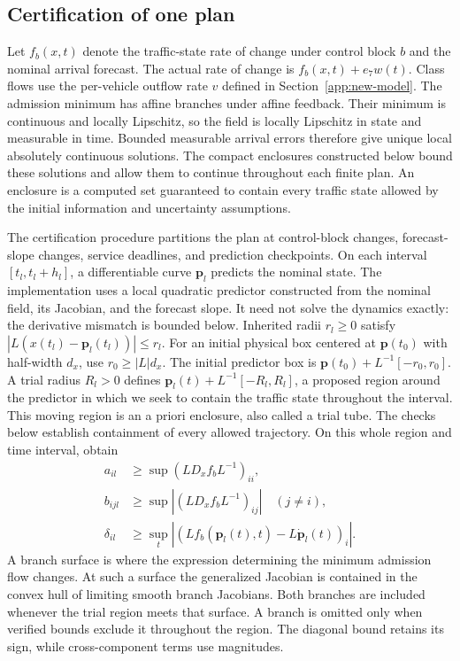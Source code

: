 \documentclass[preprint,12pt]{elsarticle}
\theoremstyle{definition}
\theoremstyle{plain}
\theoremstyle{definition}
\theoremstyle{plain}
\begin{document}
\subsection{Certification of one plan}
\label{app:new-enclosure-proof}

Let $f_b(x,t)$ denote the traffic-state rate of change under control
block $b$ and the nominal arrival forecast. The actual rate of change is
$f_b(x,t)+e_7w(t)$. Class flows use the per-vehicle outflow rate $v$ defined in
Section~\ref{app:new-model}.
The admission minimum has affine branches under affine feedback. Their
minimum is continuous and locally Lipschitz, so the field is locally
Lipschitz in state and measurable in time. Bounded measurable arrival errors
therefore give unique local absolutely continuous solutions. The compact enclosures constructed below bound these solutions and allow
them to continue throughout each finite plan. An enclosure is a computed
set guaranteed to contain every traffic state allowed by the initial
information and uncertainty assumptions.

The certification procedure partitions the plan at control-block changes, forecast-slope
changes, service deadlines, and prediction checkpoints. On each interval
$[t_l,t_l+h_l]$, a differentiable curve $\mathbf p_l$ predicts the nominal
state. The implementation uses a local quadratic predictor constructed
from the nominal field, its Jacobian, and the forecast slope. It need not
solve the dynamics exactly: the derivative mismatch is bounded below.
Inherited radii $r_l\ge0$ satisfy
$|L(x(t_l)-\mathbf{p}_l(t_l))|\le r_l$. For an initial physical box centered at
$\mathbf{p}(t_0)$ with half-width $d_x$, use $r_0\ge|L|d_x$. The initial predictor
box is $\mathbf{p}(t_0)+L^{-1}[-r_0,r_0]$. A trial radius $R_l>0$ defines
$\mathbf{p}_l(t)+L^{-1}[-R_l,R_l]$, a proposed region around the predictor in which
we seek to contain the traffic state throughout the interval. This moving
region is an a priori enclosure, also called a trial tube. The checks
below establish containment of every allowed trajectory. On this whole
region and time interval, obtain
\begin{equation}
 \begin{aligned}
 a_{il}&\ge\sup (L D_xf_b L^{-1})_{ii},\\
 b_{ijl}&\ge\sup |(L D_xf_b L^{-1})_{ij}|\quad(j\ne i),\\
 \delta_{il}&\ge\sup_t |(L f_b(\mathbf{p}_l(t),t)-L\dot{\mathbf{p}}_l(t))_i|.
 \end{aligned}
 \label{eq:new-local-bounds}
\end{equation}
A branch surface is where the expression determining the minimum
admission flow changes. At such a surface the generalized Jacobian is
contained in the convex
hull of limiting smooth branch Jacobians. Both branches are included
whenever the trial region meets that surface. A branch is omitted only
when verified bounds exclude it throughout the region. The diagonal bound
retains its sign, while cross-component terms use magnitudes.
\end{document}
